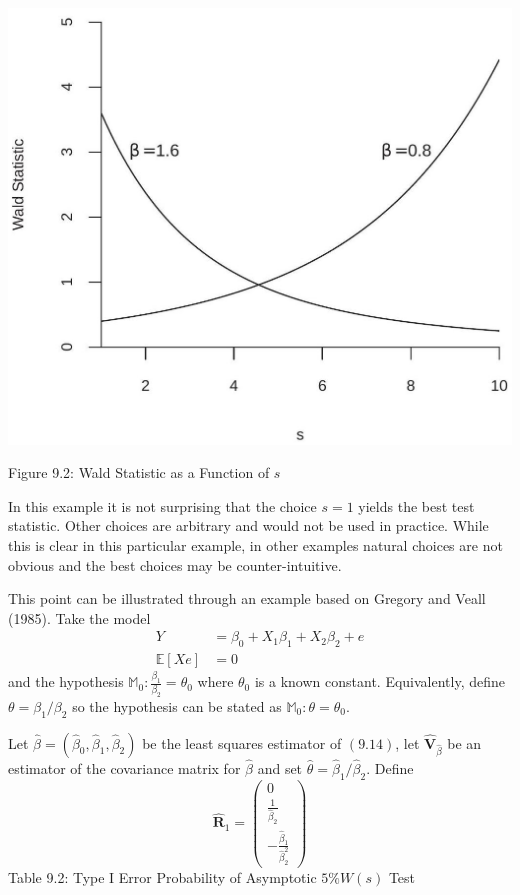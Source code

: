 \documentclass[10pt]{article}
\begin{document}
\includegraphics[max width=\textwidth]{2022_09_17_d22774979aa7978900adg-19}

Figure 9.2: Wald Statistic as a Function of $s$

In this example it is not surprising that the choice $s=1$ yields the best test statistic. Other choices are arbitrary and would not be used in practice. While this is clear in this particular example, in other examples natural choices are not obvious and the best choices may be counter-intuitive.

This point can be illustrated through an example based on Gregory and Veall (1985). Take the model
$$
\begin{aligned}
Y &=\beta_{0}+X_{1} \beta_{1}+X_{2} \beta_{2}+e \\
\mathbb{E}[X e] &=0
\end{aligned}
$$
and the hypothesis $\mathbb{M}_{0}: \frac{\beta_{1}}{\beta_{2}}=\theta_{0}$ where $\theta_{0}$ is a known constant. Equivalently, define $\theta=\beta_{1} / \beta_{2}$ so the hypothesis can be stated as $\mathbb{M}_{0}: \theta=\theta_{0}$.

Let $\widehat{\beta}=\left(\widehat{\beta}_{0}, \widehat{\beta}_{1}, \widehat{\beta}_{2}\right)$ be the least squares estimator of $(9.14)$, let $\widehat{\boldsymbol{V}}_{\widehat{\beta}}$ be an estimator of the covariance matrix for $\widehat{\beta}$ and set $\widehat{\theta}=\widehat{\beta}_{1} / \widehat{\beta}_{2}$. Define
$$
\widehat{\boldsymbol{R}}_{1}=\left(\begin{array}{c}
0 \\
\frac{1}{\widehat{\beta}_{2}} \\
-\frac{\widehat{\beta}_{1}}{\widehat{\beta}_{2}^{2}}
\end{array}\right)
$$
Table 9.2: Type I Error Probability of Asymptotic $5 \% W(s)$ Test
\end{document}
